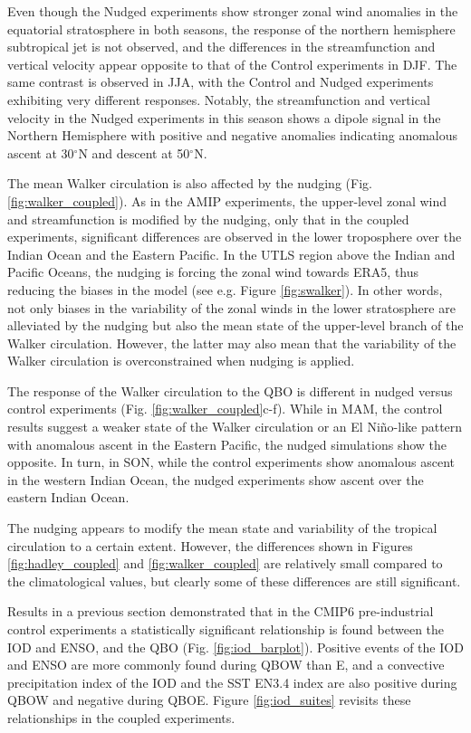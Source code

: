 Even though the Nudged experiments show stronger zonal wind anomalies in the equatorial stratosphere in both seasons, the response of the northern hemisphere subtropical jet is not observed, and the differences in the streamfunction and vertical velocity appear opposite to that of the Control experiments in DJF. 
The same contrast is observed in JJA, with the Control and Nudged experiments exhibiting very different responses. Notably, the streamfunction and vertical velocity in the Nudged experiments in this season shows a dipole signal in the Northern Hemisphere with positive and negative anomalies indicating anomalous ascent at 30$^\circ$N and descent at 50$^\circ$N.

The mean Walker circulation is also affected by the nudging (Fig. \ref{fig:walker_coupled}). As in the AMIP experiments, the upper-level zonal wind and streamfunction is modified by the nudging, only that in the coupled experiments, significant differences are observed in the lower troposphere over the Indian Ocean and the Eastern Pacific. 
In the UTLS region above the Indian and Pacific Oceans, the nudging is forcing the zonal wind towards ERA5, thus reducing the biases in the model (see e.g. Figure \ref{fig:swalker}). In other words, not only biases in the variability of the zonal winds in the lower stratosphere are alleviated by the nudging but also the mean state of the upper-level branch of the Walker circulation. However, the latter may also mean that the variability of the Walker circulation is overconstrained when nudging is applied. 

The response of the Walker circulation to the QBO is different in nudged versus control experiments (Fig. \ref{fig:walker_coupled}c-f). While in MAM, the control results suggest a weaker state of the Walker circulation or an El Niño-like pattern with anomalous ascent in the Eastern Pacific, the nudged simulations show the opposite. 
In turn, in SON, while the control experiments show anomalous ascent in the western Indian Ocean, the nudged experiments show ascent over the eastern Indian Ocean. 

The nudging appears to modify the mean state and variability of the tropical circulation to a certain extent. However, the differences shown in Figures \ref{fig:hadley_coupled} and \ref{fig:walker_coupled} are relatively small compared to the climatological values,  but clearly some of these differences are still significant. 

Results in a previous section demonstrated that in the CMIP6 pre-industrial control experiments a statistically significant relationship is found between the IOD and ENSO, and the QBO (Fig. \ref{fig:iod_barplot}). 
Positive events of the IOD and ENSO are more commonly found during QBOW than E, and a convective precipitation index of the IOD and the SST EN3.4 index are also positive during QBOW and negative during QBOE. 
Figure \ref{fig:iod_suites} revisits these relationships in the coupled experiments. 

